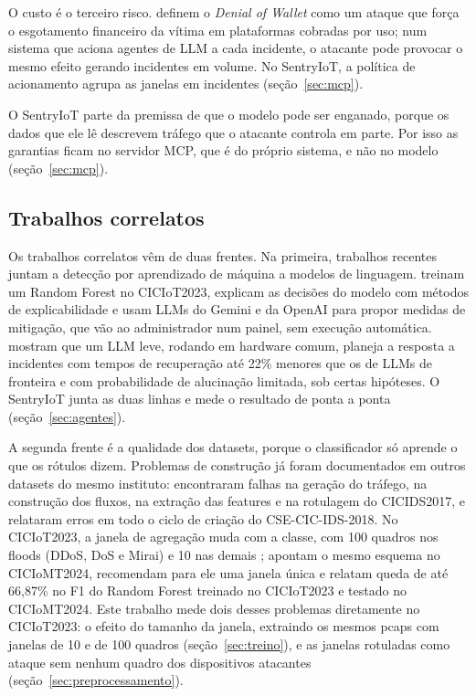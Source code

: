 O custo é o terceiro risco.  definem o \textit{Denial of Wallet} como um ataque que força o esgotamento financeiro da vítima em plataformas cobradas por uso; num sistema que aciona agentes de LLM a cada incidente, o atacante pode provocar o mesmo efeito gerando incidentes em volume. No SentryIoT, a política de acionamento agrupa as janelas em incidentes (seção~\ref{sec:mcp}).

O SentryIoT parte da premissa de que o modelo pode ser enganado, porque os dados que ele lê descrevem tráfego que o atacante controla em parte. Por isso as garantias ficam no servidor MCP, que é do próprio sistema, e não no modelo (seção~\ref{sec:mcp}).

\subsection{Trabalhos correlatos}
\label{sec:correlatos}

Os trabalhos correlatos vêm de duas frentes. Na primeira, trabalhos recentes juntam a detecção por aprendizado de máquina a modelos de linguagem.  treinam um Random Forest no CICIoT2023, explicam as decisões do modelo com métodos de explicabilidade e usam LLMs do Gemini e da OpenAI para propor medidas de mitigação, que vão ao administrador num painel, sem execução automática.  mostram que um LLM leve, rodando em hardware comum, planeja a resposta a incidentes com tempos de recuperação até 22\% menores que os de LLMs de fronteira e com probabilidade de alucinação limitada, sob certas hipóteses. O SentryIoT junta as duas linhas e mede o resultado de ponta a ponta (seção~\ref{sec:agentes}).

A segunda frente é a qualidade dos datasets, porque o classificador só aprende o que os rótulos dizem. Problemas de construção já foram documentados em outros datasets do mesmo instituto:  encontraram falhas na geração do tráfego, na construção dos fluxos, na extração das features e na rotulagem do CICIDS2017, e  relataram erros em todo o ciclo de criação do CSE-CIC-IDS-2018. No CICIoT2023, a janela de agregação muda com a classe, com 100 quadros nos floods (DDoS, DoS e Mirai) e 10 nas demais \cite{neto2023};  apontam o mesmo esquema no CICIoMT2024, recomendam para ele uma janela única e relatam queda de até 66,87\% no F1 do Random Forest treinado no CICIoT2023 e testado no CICIoMT2024. Este trabalho mede dois desses problemas diretamente no CICIoT2023: o efeito do tamanho da janela, extraindo os mesmos pcaps com janelas de 10 e de 100 quadros (seção~\ref{sec:treino}), e as janelas rotuladas como ataque sem nenhum quadro dos dispositivos atacantes (seção~\ref{sec:preprocessamento}).
